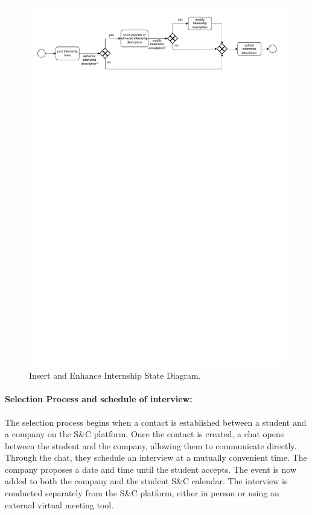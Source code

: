 \begin{figure}[H]
    \begin{center}
        \includegraphics[width=\linewidth]{Images/StateDiagram/Insert&EnhanceInternshipDescription.pdf}
        \caption{Insert and Enhance Internship State Diagram.}
        \label{fig:insert_enhance_intern_state_diag}%
    \end{center}
\end{figure}

\newpage

\paragraph{Selection Process and schedule of interview:} The selection
  process begins when a contact is established between a student and a
  company on the S\&C platform. Once the contact is created, a chat
  opens between the student and the company, allowing them to
  communicate directly. Through the chat, they schedule an interview at
  a mutually convenient time. The company proposes a date and time until
  the student accepts. The event is now added to both the company and
  the student S\&C calendar.
  The interview is conducted separately from the S\&C platform, either in person or using an external virtual meeting tool.

